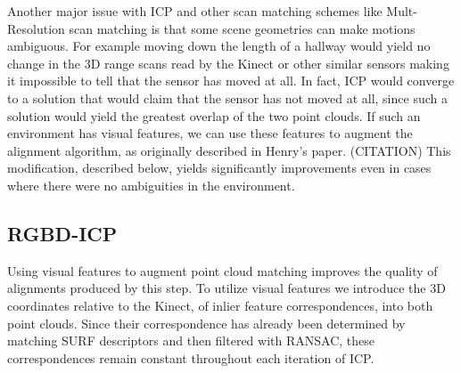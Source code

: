 \documentclass[letterpaper, 10pt, conference]{ieeeconf}
\begin{document}
	Another major issue with ICP and other scan matching schemes like Mult-Resolution scan matching is that some scene geometries can make motions ambiguous.  For example moving down the length of a hallway would yield no change in the 3D range scans read by the Kinect or other similar sensors making it impossible to tell that the sensor has moved at all.  In fact, ICP would converge to a solution that would claim that the sensor has not moved at all, since such a solution would yield the greatest overlap of the two point clouds.  If such an environment has visual features, we can use these features to augment the alignment algorithm, as originally described in Henry's paper. (CITATION)  This modification, described below, yields significantly improvements even in cases where there were no ambiguities in the environment.  

\subsection{RGBD-ICP}
Using visual features to augment point cloud matching improves the quality of alignments produced by this step.    To utilize visual features we introduce the 3D coordinates relative to the Kinect, of inlier feature correspondences, into both point clouds.  Since their correspondence has already been determined by matching SURF descriptors and then filtered with RANSAC, these correspondences remain constant throughout each iteration of ICP.
\end{document}
